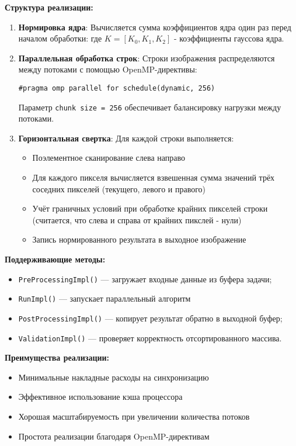\documentclass[12pt]{article}
\begin{document}
\textbf{Структура реализации:}

\begin{enumerate}
\item \textbf{Нормировка ядра}:
Вычисляется сумма коэффициентов ядра один раз перед началом обработки:
где $K = [K_0, K_1, K_2]$ - коэффициенты гауссова ядра.

\item \textbf{Параллельная обработка строк}:
Строки изображения распределяются между потоками с помощью OpenMP-директивы:
\begin{lstlisting}
#pragma omp parallel for schedule(dynamic, 256)
\end{lstlisting}
Параметр \texttt{chunk size = 256} обеспечивает балансировку нагрузки между потоками.

\item \textbf{Горизонтальная свертка}:
Для каждой строки выполняется:
\begin{itemize}
\item Поэлементное сканирование слева направо
\item Для каждого пикселя вычисляется взвешенная сумма значений трёх соседних пикселей (текущего, левого и правого)
\item Учёт граничных условий при обработке крайних пикселей строки (считается, что слева и справа от крайних пикслей - нули)
\item Запись нормированного результата в выходное изображение
\end{itemize}
\end{enumerate}

\textbf{Поддерживающие методы:}
\begin{itemize}
  \item \texttt{PreProcessingImpl()} — загружает входные данные из буфера задачи;
  \item \texttt{RunImpl()} — запускает параллельный алгоритм
  \item \texttt{PostProcessingImpl()} — копирует результат обратно в выходной буфер;
  \item \texttt{ValidationImpl()} — проверяет корректность отсортированного массива.
\end{itemize}

\textbf{Преимущества реализации:}
\begin{itemize}
\item Минимальные накладные расходы на синхронизацию
\item Эффективное использование кэша процессора
\item Хорошая масштабируемость при увеличении количества потоков
\item Простота реализации благодаря OpenMP-директивам
\end{itemize}
\end{document}
